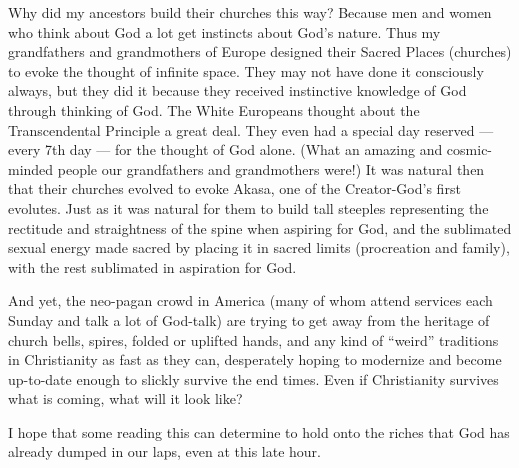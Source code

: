 \begin{quotex}
Why did my ancestors build their churches this way? Because men and women who think about God a lot get instincts about God’s nature. Thus my grandfathers and grandmothers of Europe designed their Sacred Places (churches) to evoke the thought of infinite space. They may not have done it consciously always, but they did it because they received instinctive knowledge of God through thinking of God. The White Europeans thought about the Transcendental Principle a great deal. They even had a special day reserved — every 7th day — for the thought of God alone. (What an amazing and cosmic-minded people our grandfathers and grandmothers were!) It was natural then that their churches evolved to evoke Akasa, one of the Creator-God’s first evolutes. Just as it was natural for them to build tall steeples representing the rectitude and straightness of the spine when aspiring for God, and the sublimated sexual energy made sacred by placing it in sacred limits (procreation and family), with the rest sublimated in aspiration for God.
\end{quotex}
 

And yet, the neo-pagan crowd in America (many of whom attend services each Sunday and talk a lot of God-talk) are trying to get away from the heritage of church bells, spires, folded or uplifted hands, and any kind of “weird” traditions in Christianity as fast as they can, desperately hoping to modernize and become up-to-date enough to slickly survive the end times. Even if Christianity survives what is coming, what will it look like?

I hope that some reading this can determine to hold onto the riches that God has already dumped in our laps, even at this late hour.

